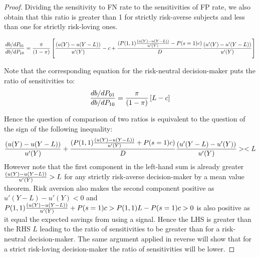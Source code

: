 \documentclass[12pt,a4paper]{article}
\begin{document}
\begin{proof}
Dividing the sensitivity to FN rate to the sensitivities of FP rate, we also obtain that this ratio is greater than 1 for strictly risk-averse subjects and less than one for strictly risk-loving ones. 

\[{db/dP_{01} \over db/dP_{10}}={\pi \over (1-\pi)} \left[{(u(Y)-u(Y-L)) \over u'(Y)}-c +{(P(1,1){(u(Y)-u(Y-L)) \over u'(Y)}-P(s=1)c) \over D}{(u'(Y)-u'(Y-L))\over u'(Y)}  \right] \]

Note that the corresponding equation for the risk-neutral decision-maker puts the ratio of sensitivities to:
\[{db/dP_{01} \over db/dP_{10}}= {\pi \over (1-\pi)} \left[L-c \right] \]

Hence the question of comparison of two ratios is equivalent to the question of the sign of the following inequality:
\[{(u(Y)-u(Y-L)) \over u'(Y)}+{(P(1,1){(u(Y)-u(Y-L)) \over u'(Y)}+P(s=1)c) \over D}{(u'(Y-L)-u'(Y))\over u'(Y)}><L\]
However note that the first component in the left-hand sum is already greater ${(u(Y)-u(Y-L)) \over u'(Y)}>L$ for any strictly risk-averse decision-maker by a mean value theorem. Risk aversion also makes the second component positive as  $u'(Y-L)-u'(Y)<0$ and $P(1,1){(u(Y)-u(Y-L)) \over u'(Y)}+P(s=1)c>P(1,1)L-P(s=1)c>0$ is also positive as it equal the expected savings from using a signal. Hence the LHS is greater than the RHS $L$ leading to the ratio of sensitivities to be greater than for a risk-neutral decision-maker. The same argument applied in reverse will show that for a strict risk-loving decision-maker the ratio of sensitivities will be lower. 
\end{proof}




\renewcommand{\contentsname}{\vspace{-1em}}

\setcounter{table}{0}
\setcounter{figure}{0}
\setcounter{equation}{0}
\setcounter{footnote}{0}
\setcounter{section}{0}
\renewcommand\thesection{\Alph{section}}
\renewcommand\theequation{\thesection.\arabic{equation}}
\renewcommand\thetable{\thesection.\arabic{table}}
\renewcommand\thefigure{\thesection.\arabic{figure}}
\renewcommand\thesubsection{\Roman{subsection}}
\end{document}
